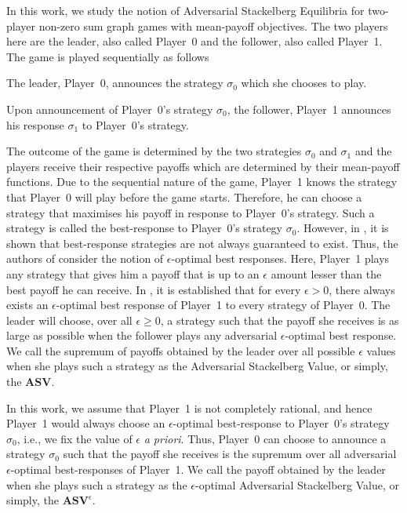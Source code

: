 In this work, we study the notion of Adversarial Stackelberg Equilibria for two-player non-zero sum graph games with mean-payoff objectives. The two players here are the leader, also called Player~0 and the follower, also called Player~1. The game is played sequentially as follows
\begin{inparaenum}[(i)]
\item The leader, Player~0, announces the strategy $\sigma_0$ which she chooses to play.
\item Upon announcement of Player~0's strategy $\sigma_0$, the follower, Player~1 announces his response $\sigma_1$ to Player~0's strategy.
\end{inparaenum}
The outcome of the game is determined by the two strategies $\sigma_0$ and $\sigma_1$ and the players receive their respective payoffs which are determined by their mean-payoff functions. Due to the sequential nature of the game, Player~1 knows the strategy that Player~0 will play before the game starts. Therefore, he can choose a strategy that maximises his payoff in response to Player~0's strategy. Such a strategy is called the best-response to Player~0's strategy $\sigma_0$. However, in \cite{FGR20}, it is shown that best-response strategies are not always guaranteed to exist. Thus, the authors of \cite{FGR20} consider the notion of $\epsilon$-optimal best responses. Here, Player~1  plays any strategy that gives him a payoff that is up to an $\epsilon$ amount lesser than the best payoff he can receive. In \cite{FGR20}, it is  established that for every $\epsilon > 0$, there always exists an $\epsilon$-optimal best response of Player~1 to every strategy of Player~0. The leader will choose, over all $\epsilon \geqslant 0$, a strategy such that the payoff she receives is as large as possible when the follower plays any adversarial $\epsilon$-optimal best response. We call the supremum of payoffs obtained by the leader over all possible $\epsilon$ values when she plays such a strategy as the Adversarial Stackelberg Value, or simply, the $\mathbf{ASV}$.

In this work, we assume that Player~1 is not completely rational, and hence Player~1 would always choose an $\epsilon$-optimal best-response to Player~0's strategy $\sigma_0$, i.e., we fix the value of $\epsilon$ \emph{a priori}. Thus, Player~0 can choose to announce a strategy $\sigma_0$ such that the payoff she receives is the supremum over all adversarial $\epsilon$-optimal best-responses of Player~1. We call the payoff obtained by the leader when she plays such a strategy as the $\epsilon$-optimal Adversarial Stackelberg Value, or simply, the $\mathbf{ASV}^{\epsilon}$.

